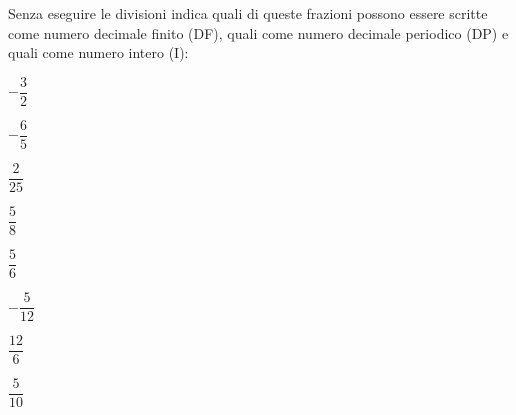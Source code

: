 \begin{esercizio}
 \label{ese:3.19}
 Senza eseguire le divisioni indica quali di queste frazioni possono essere 
 scritte come numero decimale finito (DF), quali come numero decimale 
 periodico (DP) e quali come numero intero (I):
 
 \begin{multicols}{2}
 \TabPositions{1cm}
 \begin{enumeratea}
 \item $-\dfrac{3}{2}$ 
\tab\qquad\boxDF\qquad\boxDP\quad\enspace\enspace\boxI\vspace{1.1ex}
 \item $-\dfrac{6}{5}$ 
\tab\qquad\boxDF\qquad\boxDP\quad\enspace\enspace\boxI\vspace{1.1ex}
 \item $\dfrac{2}{25}$ 
\tab\qquad\boxDF\qquad\boxDP\quad\enspace\enspace\boxI\vspace{1.1ex}
 \item $\dfrac{5}{8}$ \tab\qquad\boxDF\qquad\boxDP\quad\enspace\enspace\boxI
 \item $\dfrac{5}{6}$ 
\tab\qquad\boxDF\qquad\boxDP\quad\enspace\enspace\boxI\vspace{1.1ex}
 \item $-\dfrac{5}{12}$ 
\tab\qquad\boxDF\qquad\boxDP\quad\enspace\enspace\boxI\vspace{1.1ex}
 \item $\dfrac{12}{6}$ 
\tab\qquad\boxDF\qquad\boxDP\quad\enspace\enspace\boxI\vspace{1.1ex}
 \item $\dfrac{5}{10}$ \tab\qquad\boxDF\qquad\boxDP\quad\enspace\enspace\boxI
 \end{enumeratea}
 \end{multicols}
\end{esercizio}

